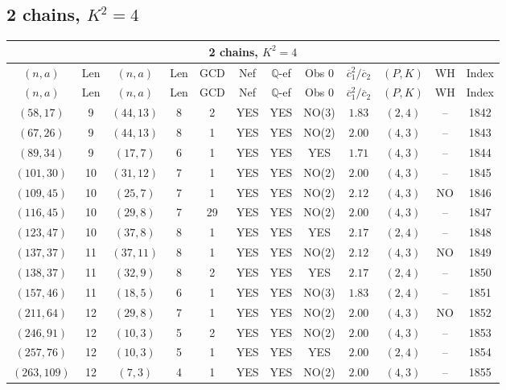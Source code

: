 \subsection{2 chains, $K^2 = 4$}
\begin{longtable}{|c|c|c|c|c|c|c|c|c|c|c|c|}
\hline
\multicolumn{12}{|c|}{2 chains, $K^2 = 4$}\\
\hline
$(n,a)$ & Len & $(n,a)$ & Len & GCD & Nef & $\mathbb Q$-ef & Obs 0 & $\overline c_1^2 / \overline c_2$ & $(P,K)$ & WH & Index\\
\hline
\endfirsthead

\hline
$(n,a)$ & Len & $(n,a)$ & Len & GCD & Nef & $\mathbb Q$-ef & Obs 0 & $\overline c_1^2 / \overline c_2$ & $(P,K)$ & WH & Index\\
\hline
\endhead
\hline
\endfoot

$(58,17)$ & 9 & $(44,13)$ & 8 & 2 & YES & YES & NO(3) & $1.83$ & $(2,4)$ & -- & 1842\\
$(67,26)$ & 9 & $(44,13)$ & 8 & 1 & YES & YES & NO(2) & $2.00$ & $(4,3)$ & -- & 1843\\
$(89,34)$ & 9 & $(17,7)$ & 6 & 1 & YES & YES & YES & $1.71$ & $(4,3)$ & -- & 1844\\
$(101,30)$ & 10 & $(31,12)$ & 7 & 1 & YES & YES & NO(2) & $2.00$ & $(4,3)$ & -- & 1845\\
$(109,45)$ & 10 & $(25,7)$ & 7 & 1 & YES & YES & NO(2) & $2.12$ & $(4,3)$ & NO & 1846\\
$(116,45)$ & 10 & $(29,8)$ & 7 & 29 & YES & YES & NO(2) & $2.00$ & $(4,3)$ & -- & 1847\\
$(123,47)$ & 10 & $(37,8)$ & 8 & 1 & YES & YES & YES & $2.17$ & $(2,4)$ & -- & 1848\\
$(137,37)$ & 11 & $(37,11)$ & 8 & 1 & YES & YES & NO(2) & $2.12$ & $(4,3)$ & NO & 1849\\
$(138,37)$ & 11 & $(32,9)$ & 8 & 2 & YES & YES & YES & $2.17$ & $(2,4)$ & -- & 1850\\
$(157,46)$ & 11 & $(18,5)$ & 6 & 1 & YES & YES & NO(3) & $1.83$ & $(2,4)$ & -- & 1851\\
$(211,64)$ & 12 & $(29,8)$ & 7 & 1 & YES & YES & NO(2) & $2.00$ & $(4,3)$ & NO & 1852\\
$(246,91)$ & 12 & $(10,3)$ & 5 & 2 & YES & YES & NO(2) & $2.00$ & $(4,3)$ & -- & 1853\\
$(257,76)$ & 12 & $(10,3)$ & 5 & 1 & YES & YES & YES & $2.00$ & $(2,4)$ & -- & 1854\\
$(263,109)$ & 12 & $(7,3)$ & 4 & 1 & YES & YES & NO(2) & $2.00$ & $(4,3)$ & -- & 1855\\

\end{longtable}
